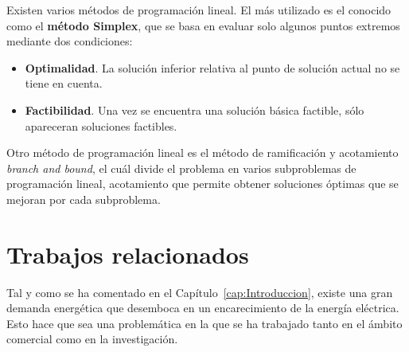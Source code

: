 Existen varios métodos de programación lineal. El más utilizado es el conocido como el \textbf{método Simplex}, que se basa en evaluar solo algunos puntos extremos mediante dos condiciones:
\begin{itemize}
\item \textbf{Optimalidad}. La solución inferior relativa al punto de solución actual no se tiene en cuenta.
  \item \textbf{Factibilidad}. Una vez se encuentra una solución básica factible, sólo apareceran soluciones factibles.
\end{itemize}
Otro método de programación lineal es el método de ramificación y acotamiento \textit{branch and bound}, el cuál divide el problema en varios subproblemas de programación lineal, acotamiento que permite obtener soluciones óptimas que se mejoran por cada subproblema.\\

\section{Trabajos relacionados}
Tal y como se ha comentado en el Capítulo~\ref{cap:Introduccion}, existe una gran demanda energética que desemboca en un encarecimiento de la energía eléctrica. Esto hace que sea una problemática en la que se ha trabajado tanto en el ámbito comercial como en la investigación.\\

